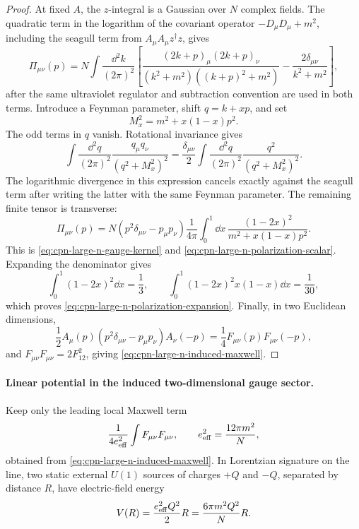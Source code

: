 \begin{proof}
At fixed \(A\), the \(z\)-integral is a Gaussian over \(N\) complex fields.
The quadratic term in the logarithm of the covariant operator
\(-D_\mu D_\mu+m^2\), including the seagull term from \(A_\mu A_\mu z^\dagger
z\), gives
\[
  \Pi_{\mu\nu}(p)
  =
  N\int\frac{\dd^2k}{(2\pi)^2}
  \left[
    \frac{(2k+p)_\mu(2k+p)_\nu}
    {(k^2+m^2)((k+p)^2+m^2)}
    -
    \frac{2\delta_{\mu\nu}}{k^2+m^2}
  \right],
\]
after the same ultraviolet regulator and subtraction convention are used in
both terms.  Introduce a Feynman parameter, shift \(q=k+xp\), and set
\[
  M_x^2=m^2+x(1-x)p^2 .
\]
The odd terms in \(q\) vanish.  Rotational invariance gives
\[
  \int\frac{\dd^2q}{(2\pi)^2}
  \frac{q_\mu q_\nu}{(q^2+M_x^2)^2}
  =
  \frac{\delta_{\mu\nu}}2
  \int\frac{\dd^2q}{(2\pi)^2}
  \frac{q^2}{(q^2+M_x^2)^2}.
\]
The logarithmic divergence in this expression cancels exactly against the
seagull term after writing the latter with the same Feynman parameter.  The
remaining finite tensor is transverse:
\[
  \Pi_{\mu\nu}(p)
  =
  N(p^2\delta_{\mu\nu}-p_\mu p_\nu)
  \frac1{4\pi}\int_0^1\dd x\,
  \frac{(1-2x)^2}{m^2+x(1-x)p^2}.
\]
This is \eqref{eq:cpn-large-n-gauge-kernel} and
\eqref{eq:cpn-large-n-polarization-scalar}.  Expanding the denominator gives
\[
  \int_0^1(1-2x)^2\dd x=\frac13,\qquad
  \int_0^1(1-2x)^2x(1-x)\dd x=\frac1{30},
\]
which proves \eqref{eq:cpn-large-n-polarization-expansion}.  Finally, in two
Euclidean dimensions,
\[
  \frac12 A_\mu(p)(p^2\delta_{\mu\nu}-p_\mu p_\nu)A_\nu(-p)
  =
  \frac14 F_{\mu\nu}(p)F_{\mu\nu}(-p),
\]
and \(F_{\mu\nu}F_{\mu\nu}=2F_{12}^2\), giving
\eqref{eq:cpn-large-n-induced-maxwell}.
\end{proof}

\paragraph{Linear potential in the induced two-dimensional gauge sector.}
Keep only the leading local Maxwell term
\begin{equation}
  \frac1{4e_{\rm eff}^2}\int F_{\mu\nu}F_{\mu\nu},
  \qquad
  e_{\rm eff}^2=\frac{12\pi m^2}{N},
  \label{eq:cpn-large-n-effective-charge}
\end{equation}
obtained from \eqref{eq:cpn-large-n-induced-maxwell}.  In Lorentzian
signature on the line, two static external \(U(1)\) sources of charges
\(+Q\) and \(-Q\), separated by distance \(R\), have electric-field energy
\begin{equation}
  V(R)=\frac{e_{\rm eff}^2Q^2}{2}R
  =
  \frac{6\pi m^2Q^2}{N}R .
  \label{eq:cpn-large-n-linear-potential}
\end{equation}


